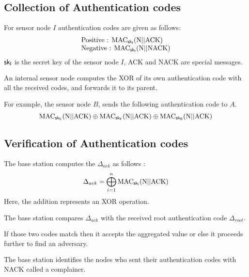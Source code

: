 \documentclass[%
  slidesonly,%
  semlayer%
  ]{seminar}                                  %
\newcommand{\sk}{\sf{sk}}
\begin{document}
\begin{slide}
    \subsection*{Collection of Authentication codes}
        \vfill
        For sensor node $I$ authentication codes are given as follows:
        \begin{equation}
          \begin{array}{l}
            \mbox{Positive : } \mbox{MAC}_{\sk_{I}}(\mbox{N} || \mbox{ACK})\\
            \mbox{Negative : } \mbox{MAC}_{\sk_{I}}(\mbox{N} || \mbox{NACK})
          \end{array}
        \end{equation}        
        $\sk_{I}$ is the secret key of the sensor node $I$, ACK and NACK are special messages.

        An internal sensor node computes the XOR of its own authentication code with all the received codes, and forwards it to its parent.
 
        For example, the sensor node $B$, sends the following authentication code to $A$.
        \begin{equation*}
          \mbox{MAC}_{\sk_{E}}(\mbox{N}||\mbox{ACK}) \oplus \mbox{MAC}_{\sk_{F}}(\mbox{N}||\mbox{ACK}) \oplus \mbox{MAC}_{\sk_{B}}(\mbox{N}||\mbox{ACK})
        \end{equation*}
        \vfill
        \clearpage

    \subsection*{Verification of Authentication codes}
        \vfill
        The base station computes the $\Delta_{ack}$ as follows :
        \begin{equation*}
          \displaystyle{\Delta_{ack} = \bigoplus_{i = 1}^n \mbox{MAC}_{\sk_{i}}(\mbox{N} || \mbox{ACK}) }
        \end{equation*}
        Here, the addition represents an XOR operation.

        The base station compares   $\Delta_{ack}$ with the received root authentication code $\Delta_{root}$. 
        
        If those two codes match then it accepts the aggregated value or else it proceeds further to find an adversary. 

        The base station identifies the nodes who sent their authentication codes with NACK called a complainer. 
        

\end{slide}
\end{document}
